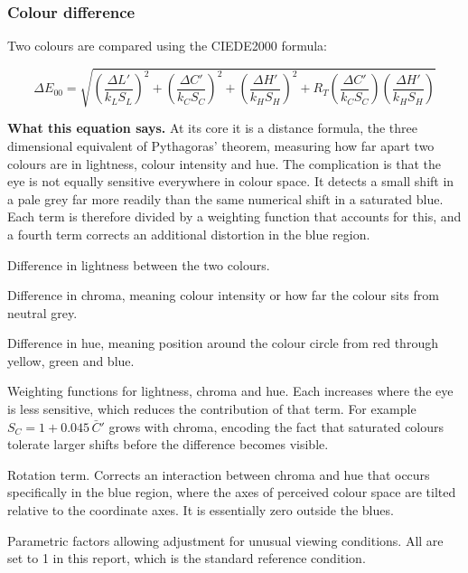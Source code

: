 \documentclass[11pt,a4paper]{article}
\newcommand{\dE}{\ensuremath{\Delta E_{00}}}
\newenvironment{symlist}
  {\vspace{-0.2em}\begin{list}{}{%
    \setlength{\leftmargin}{2.4em}\setlength{\labelwidth}{2.0em}%
    \setlength{\labelsep}{0.4em}\setlength{\itemsep}{1pt}%
    \setlength{\parsep}{0pt}\setlength{\topsep}{3pt}%
    \renewcommand{\makelabel}[1]{##1\hfil}}}
  {\end{list}}
\begin{document}
\subsubsection{Colour difference}

Two colours are compared using the CIEDE2000 formula:

\begin{equation}
\dE = \sqrt{
\left(\frac{\Delta L'}{k_L S_L}\right)^{\!2}
+\left(\frac{\Delta C'}{k_C S_C}\right)^{\!2}
+\left(\frac{\Delta H'}{k_H S_H}\right)^{\!2}
+ R_T\!\left(\frac{\Delta C'}{k_C S_C}\right)\!\left(\frac{\Delta H'}{k_H S_H}\right)}
\label{eq:de00}
\end{equation}

\noindent\textbf{What this equation says.} At its core it is a distance
formula, the three dimensional equivalent of Pythagoras' theorem, measuring how
far apart two colours are in lightness, colour intensity and hue. The
complication is that the eye is not equally sensitive everywhere in colour
space. It detects a small shift in a pale grey far more readily than the same
numerical shift in a saturated blue. Each term is therefore divided by a
weighting function that accounts for this, and a fourth term corrects an
additional distortion in the blue region.

\begin{symlist}
\item[$\Delta L'$] Difference in lightness between the two colours.
\item[$\Delta C'$] Difference in chroma, meaning colour intensity or how far
the colour sits from neutral grey.
\item[$\Delta H'$] Difference in hue, meaning position around the colour
circle from red through yellow, green and blue.
\item[$S_L,S_C,S_H$] Weighting functions for lightness, chroma and hue. Each
increases where the eye is less sensitive, which reduces the contribution of
that term. For example $S_C = 1 + 0.045\,\bar{C}'$ grows with chroma, encoding
the fact that saturated colours tolerate larger shifts before the difference
becomes visible.
\item[$R_T$] Rotation term. Corrects an interaction between chroma and hue that
occurs specifically in the blue region, where the axes of perceived colour
space are tilted relative to the coordinate axes. It is essentially zero
outside the blues.
\item[$k_L,k_C,k_H$] Parametric factors allowing adjustment for unusual viewing
conditions. All are set to 1 in this report, which is the standard reference
condition.
\end{symlist}
\end{document}
